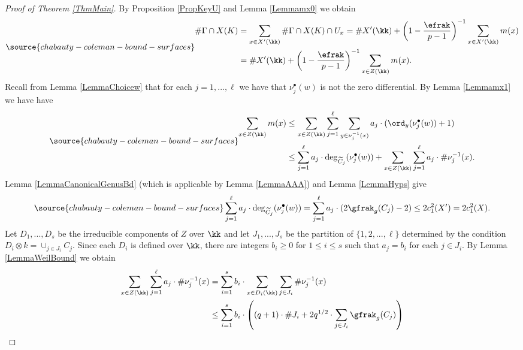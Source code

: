 \begin{proof}[Proof of Theorem \ref{ThmMain}] By Proposition \ref{PropKeyU} and  Lemma \ref{Lemmamx0} we obtain
\begin{equation}\label{EqnFinalU}
\source{chabauty-coleman-bound-surfaces}
\begin{aligned}
\# \Gamma\cap X(K)& =\sum_{x\in X'(\kk)} \# \Gamma \cap X(K)\cap U_x= \# X'(\kk) + \left(1-\frac{\efrak}{p-1}\right)^{-1}\sum_{x\in X'(\kk)} m(x)\\
&= \# X'(\kk) + \left(1-\frac{\efrak}{p-1}\right)^{-1}\sum_{x\in Z(\kk)} m(x).
\end{aligned}
\end{equation}
Recall from Lemma \ref{LemmaChoicew} that for each $j=1,...,\ell$ we have that $\nu_j^\bullet(w)$ is not the zero differential. By Lemma \ref{Lemmamx1} we have have
\begin{equation}\label{EqnFinalm}
\source{chabauty-coleman-bound-surfaces}
\begin{aligned}
\sum_{x\in Z(\kk)} m(x)&\le \sum_{x\in Z(\kk)} \sum_{j=1}^\ell \sum_{y\in \nu_j^{-1}(x)} a_j\cdot (\ord_y(\nu_j^\bullet(w))+1)\\
&\le \sum_{j=1}^\ell a_j\cdot \deg_{\widetilde{C}_j}(\nu_j^\bullet (w)) + \sum_{x\in Z(\kk)} \sum_{j=1}^\ell a_j\cdot \#\nu_j^{-1}(x).
\end{aligned}
\end{equation}
Lemma \ref{LemmaCanonicalGenusBd} (which is applicable by Lemma \ref{LemmaAAA}) and Lemma  \ref{LemmaHyps} give
\begin{equation}\label{EqnFinalS1}
\source{chabauty-coleman-bound-surfaces}
\sum_{j=1}^\ell a_j\cdot \deg_{\widetilde{C}_j}(\nu_j^\bullet (w)) = \sum_{j=1}^\ell a_j\cdot (2 \gfrak_g({C}_j) -2)\le 2c_1^2(X')=2c_1^2(X).
\end{equation}
Let $D_1,..., D_s$ be the irreducible components of $Z$ over $\kk$ and let $J_1,...,J_s$ be the partition of $\{1,2,...,\ell\}$ determined by the condition $D_i\otimes k=\cup_{j\in J_i} C_j$. Since each $D_i$ is defined over $\kk$, there are integers $b_i\ge 0$ for $1\le i\le s$ such that $a_j=b_i$ for each $j\in J_i$. By Lemma \ref{LemmaWeilBound}   we obtain
$$
\begin{aligned}
\sum_{x\in Z(\kk)} \sum_{j=1}^\ell a_j\cdot \#\nu_j^{-1}(x) & =\sum_{i=1}^s b_i \cdot \sum_{x\in D_i(\kk)} \sum_{j\in J_i} \#\nu_j^{-1}(x) \\
& \le \sum_{i=1}^s b_i \cdot \left(  (q+1)\cdot \#J_i + 2q^{1/2}\cdot \sum_{j\in J_i} \gfrak_g(C_j) \right)\\

\end{aligned}$$
\end{proof}
